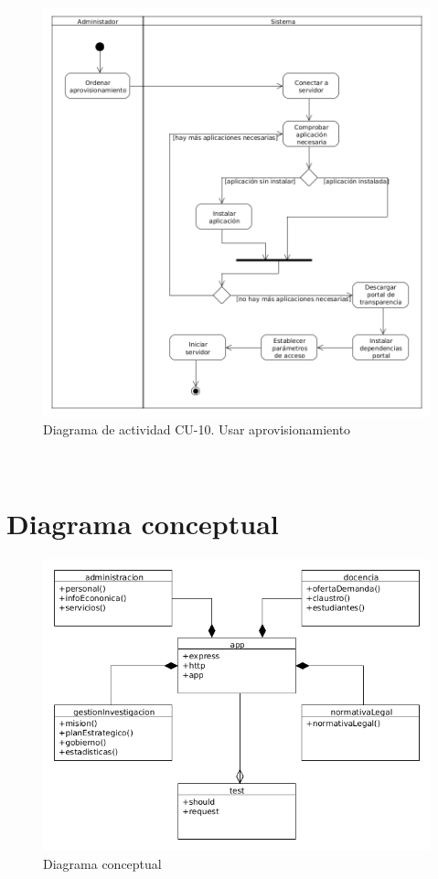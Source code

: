 \begin{figure}[!ht]
  \begin{center}
  \includegraphics[width=1\textwidth]{imagenes/diag_act_cu_10.png}
  \caption{Diagrama de actividad CU-10. Usar aprovisionamiento}
  \label{fig:diag_act_cu_10}
  \end{center}
\end{figure}

\newpage
\
\newpage
\
\newpage
\
\newpage
\
\newpage
\
\newpage
\
\newpage
\
\newpage
\
\newpage

\section{Diagrama conceptual}

\begin{figure}[!ht]
  \begin{center}
  \includegraphics[width=1\textwidth]{imagenes/diagrama_conceptual.png}
  \caption{Diagrama conceptual}
  \label{fig:diagrama_conceptual}
  \end{center}
\end{figure}